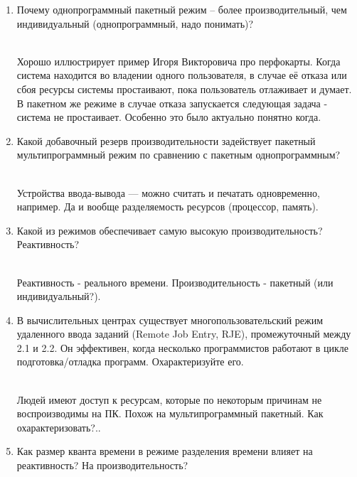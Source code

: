\documentclass[12pt, a4paper]{article}
\begin{document}
\begin{enumerate}
  \item \begin{bf}Почему однопрограммный пакетный режим – более производительный, чем индивидуальный (однопрограммный, надо понимать)?\end{bf} \\

    Хорошо иллюстрирует пример Игоря Викторовича про перфокарты. Когда система находится во владении одного пользователя, в случае её отказа или сбоя
    ресурсы системы простаивают, пока пользователь отлаживает и думает. В пакетном же режиме в случае отказа запускается следующая задача - система
    не простаивает. Особенно это было актуально понятно когда.

  \item \begin{bf} Какой добавочный резерв производительности задействует пакетный мультипрограммный режим по сравнению с пакетным однопрограммным? \end{bf} \\

    Устройства ввода-вывода --- можно считать и печатать одновременно, например. Да и вообще разделяемость ресурсов (процессор, память).

  \item \begin{bf} Какой из режимов обеспечивает самую высокую производительность? Реактивность? \end{bf} \\

      Реактивность - реального времени. Производительность - пакетный (или индивидуальный?). 

    \item \begin{bf} В вычислительных центрах существует многопользовательский режим удаленного ввода заданий (Remote Job Entry, RJE), промежуточный между 2.1 и 2.2. Он эффективен, когда несколько программистов работают в цикле подготовка/отладка программ. Охарактеризуйте его. \end{bf} \\

	Людей имеют доступ к ресурсам, которые по некоторым причинам не воспроизводимы на ПК. Похож на мультипрограммный пакетный.
	Как охарактеризовать?..

  \item \begin{bf}Как размер кванта времени в режиме разделения времени влияет на реактивность? На производительность?\end{bf}\\


\end{enumerate}
\end{document}

